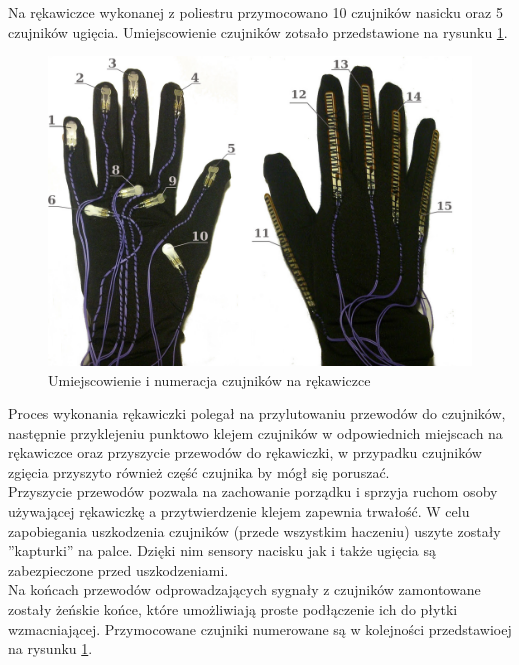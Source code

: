 \documentclass{article}
\begin{document}
Na rękawiczce wykonanej z poliestru przymocowano 10 czujników nasicku oraz 5 czujników ugięcia. Umiejscowienie czujników zotsało przedstawione na rysunku \ref{rys:czujniki_numeracja}.\\
\begin{figure}[H]
    \centering
    \includegraphics[width=14cm]{rekawiczka_umiejscowienie.jpg}
    \caption{Umiejscowienie i numeracja czujników na rękawiczce}
    \label{rys:czujniki_numeracja}
\end{figure}
Proces wykonania rękawiczki polegał na przylutowaniu przewodów do czujników, następnie przyklejeniu punktowo klejem czujników w odpowiednich miejscach na rękawiczce oraz przyszycie przewodów do rękawiczki, w przypadku czujników zgięcia przyszyto również część czujnika by mógł się poruszać. \\
Przyszycie przewodów pozwala na zachowanie porządku i sprzyja ruchom osoby używającej rękawiczkę a przytwierdzenie klejem zapewnia trwałość. W celu zapobiegania uszkodzenia czujników (przede wszystkim haczeniu) uszyte zostały ''kapturki'' na palce. Dzięki nim sensory nacisku jak i także ugięcia są zabezpieczone przed uszkodzeniami.\\
Na końcach przewodów odprowadzających sygnały z czujników zamontowane zostały żeńskie końce, które umożliwiają proste podłączenie ich do płytki wzmacniającej. Przymocowane czujniki numerowane są w kolejności przedstawioej na rysunku \ref{rys:czujniki_numeracja}.
\end{document}
